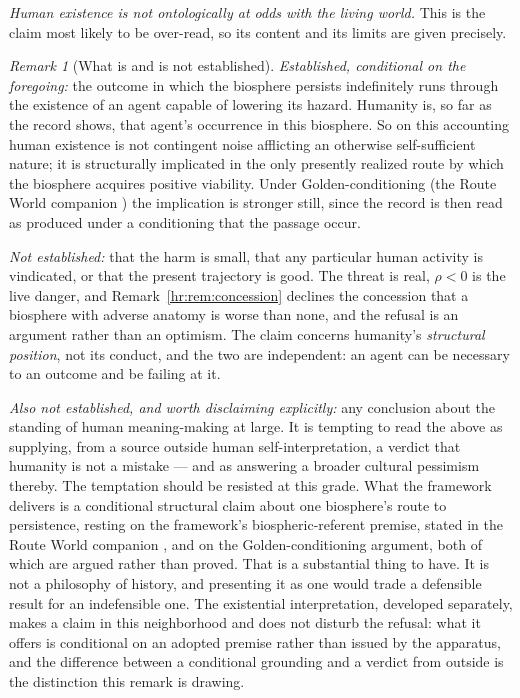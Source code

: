 \documentclass[11pt]{article}
\theoremstyle{plain}
\theoremstyle{definition}
\theoremstyle{remark}
\newtheorem{remark}[theorem]{Remark}
\begin{document}
\emph{Human existence is not ontologically at odds with the living
world.} This is the claim most likely to be over-read, so its content
and its limits are given precisely.

\begin{remark}[What is and is not established]\label{hr:rem:notmistake}
\emph{Established, conditional on the foregoing:} the outcome in which
the biosphere persists indefinitely runs through the existence of an
agent capable of lowering its hazard. Humanity is, so far as the record
shows, that agent's occurrence in this biosphere. So on this accounting
human existence is not contingent noise afflicting an otherwise
self-sufficient nature; it is structurally implicated in the only
presently realized route by which the biosphere acquires positive
viability. Under Golden-conditioning
(the Route World companion \cite{RouteWorld}) the implication is stronger still, since the record is
then read as produced under a conditioning that the passage occur.

\emph{Not established:} that the harm is small, that any particular
human activity is vindicated, or that the present trajectory is good.
The threat is real, $\rho<0$ is the live danger, and
Remark~\ref{hr:rem:concession} declines the concession that a biosphere
with adverse anatomy is worse than none, and the refusal is an argument
rather than an optimism. The claim concerns humanity's
\emph{structural position}, not its conduct, and the two are
independent: an agent can be necessary to an outcome and be failing at
it.

\emph{Also not established, and worth disclaiming explicitly:} any
conclusion about the standing of human meaning-making at large. It is
tempting to read the above as supplying, from a source outside human
self-interpretation, a verdict that humanity is not a mistake --- and as
answering a broader cultural pessimism thereby. The temptation should be
resisted at this grade. What the framework delivers is a conditional
structural claim about one biosphere's route to persistence, resting on
the framework's biospheric-referent premise, stated in the Route World companion \cite{RouteWorld}, and on the Golden-conditioning argument, both of which are
argued rather than proved. That is a substantial thing to have. It is
not a philosophy of history, and presenting it as one would trade a
defensible result for an indefensible one. The existential interpretation, developed separately, makes a
claim in this neighborhood and does not disturb the refusal: what it offers
is conditional on an adopted premise rather than issued by the
apparatus, and the difference between a conditional grounding and a verdict
from outside is the distinction this remark is drawing.
\end{remark}
\end{document}
